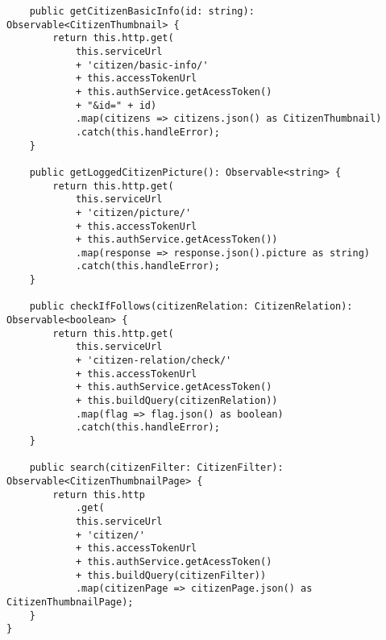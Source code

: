 \begin {lstlisting}
    public getCitizenBasicInfo(id: string): Observable<CitizenThumbnail> {
        return this.http.get(
            this.serviceUrl
            + 'citizen/basic-info/'
            + this.accessTokenUrl
            + this.authService.getAcessToken()
            + "&id=" + id)
            .map(citizens => citizens.json() as CitizenThumbnail)
            .catch(this.handleError);
    }

    public getLoggedCitizenPicture(): Observable<string> {
        return this.http.get(
            this.serviceUrl
            + 'citizen/picture/'
            + this.accessTokenUrl
            + this.authService.getAcessToken())
            .map(response => response.json().picture as string)
            .catch(this.handleError);
    }

    public checkIfFollows(citizenRelation: CitizenRelation): Observable<boolean> {
        return this.http.get(
            this.serviceUrl
            + 'citizen-relation/check/'
            + this.accessTokenUrl
            + this.authService.getAcessToken()
            + this.buildQuery(citizenRelation))
            .map(flag => flag.json() as boolean)
            .catch(this.handleError);
    }

    public search(citizenFilter: CitizenFilter): Observable<CitizenThumbnailPage> {
        return this.http
            .get(
            this.serviceUrl
            + 'citizen/'
            + this.accessTokenUrl
            + this.authService.getAcessToken()
            + this.buildQuery(citizenFilter))
            .map(citizenPage => citizenPage.json() as CitizenThumbnailPage);
    }
}
\end{lstlisting}
